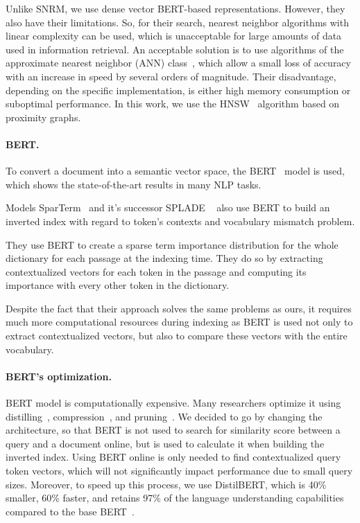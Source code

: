 \documentclass[
    twocolumn,
]{template/ceurart}
\begin{document}
    Unlike SNRM, we use dense vector BERT-based representations.
    However, they also have their limitations.
    So, for their search, nearest neighbor algorithms with linear complexity can be used,
    which is unacceptable for large amounts of data used in information retrieval.
    An acceptable solution is to use algorithms of the approximate nearest neighbor (ANN) class~\cite{ann},
    which allow a small loss of accuracy with an increase in speed by several orders of magnitude.
    Their disadvantage, depending on the specific implementation,
    is either high memory consumption or suboptimal performance.
    In this work, we use the HNSW~\cite{hnsw} algorithm based on proximity graphs.

    \paragraph{BERT.}
    To convert a document into a semantic vector space, the BERT~\cite{devlin2018bert} model is used,
    which shows the state-of-the-art results in many NLP tasks.

    Models SparTerm~\cite{sparTerm} and it's successor SPLADE ~\cite{splade} also use BERT to build an inverted
    index with regard to token's contexts and vocabulary mismatch problem.

    They use BERT to create a sparse term importance distribution for the whole dictionary for each passage at the indexing time.
    They do so by extracting contextualized vectors for each token in the passage and computing its importance with every other
    token in the dictionary.

    Despite the fact that their approach solves the same problems as ours, it requires much more computational resources during indexing
    as BERT is used not only to extract contextualized vectors, but also to compare these vectors with the
    entire vocabulary.

    \paragraph{BERT's optimization.}
    BERT model is computationally expensive.
    Many researchers optimize it using distilling~\cite{bertDistilling},
    compression~\cite{bertCompression}, and pruning~\cite{bertPruning}.
    We decided to go by changing the architecture, so that BERT is not used to search for
    similarity score between a query and a document online,
    but is used to calculate it when building the inverted index.
    Using BERT online is only needed to find contextualized query token vectors,
    which will not significantly impact performance due to small query sizes.
    Moreover, to speed up this process, we use DistilBERT, which is 40\% smaller, 60\% faster,
    and retains 97\% of the language understanding capabilities compared to the base BERT~\cite{bertDistilling}.
\end{document}
